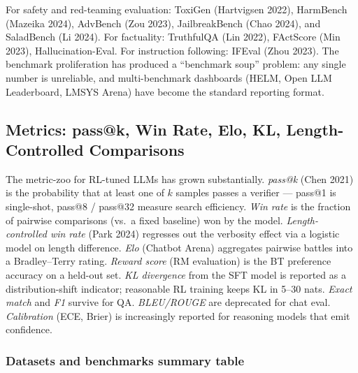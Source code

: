 For safety and red-teaming evaluation: ToxiGen (Hartvigsen 2022), HarmBench (Mazeika 2024), AdvBench (Zou 2023), JailbreakBench (Chao 2024), and SaladBench (Li 2024). For factuality: TruthfulQA (Lin 2022), FActScore (Min 2023), Hallucination-Eval. For instruction following: IFEval (Zhou 2023). The benchmark proliferation has produced a ``benchmark soup'' problem: any single number is unreliable, and multi-benchmark dashboards (HELM, Open LLM Leaderboard, LMSYS Arena) have become the standard reporting format.

\subsection{Metrics: pass@k, Win Rate, Elo, KL, Length-Controlled Comparisons}\label{metrics-passk-win-rate-elo-kl-length-controlled-comparisons}

The metric-zoo for RL-tuned LLMs has grown substantially. \emph{pass@k} (Chen 2021) is the probability that at least one of \(k\) samples passes a verifier --- pass@1 is single-shot, pass@8 / pass@32 measure search efficiency. \emph{Win rate} is the fraction of pairwise comparisons (vs.~a fixed baseline) won by the model. \emph{Length-controlled win rate} (Park 2024) regresses out the verbosity effect via a logistic model on length difference. \emph{Elo} (Chatbot Arena) aggregates pairwise battles into a Bradley--Terry rating. \emph{Reward score} (RM evaluation) is the BT preference accuracy on a held-out set. \emph{KL divergence} from the SFT model is reported as a distribution-shift indicator; reasonable RL training keeps KL in 5--30 nats. \emph{Exact match} and \emph{F1} survive for QA. \emph{BLEU/ROUGE} are deprecated for chat eval. \emph{Calibration} (ECE, Brier) is increasingly reported for reasoning models that emit confidence.

\subsubsection{Datasets and benchmarks summary table}\label{datasets-and-benchmarks-summary-table}

